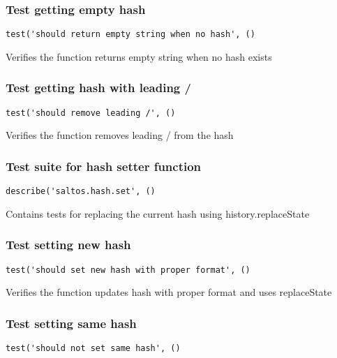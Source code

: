 \documentclass[a4paper]{article}
\begin{document}
\subsubsection{Test getting empty hash}

\begin{lstlisting}
test('should return empty string when no hash', ()
\end{lstlisting}

Verifies the function returns empty string when no hash exists

\hypertarget{toc638}{}
\subsubsection{Test getting hash with leading /}

\begin{lstlisting}
test('should remove leading /', ()
\end{lstlisting}

Verifies the function removes leading / from the hash

\hypertarget{toc639}{}
\subsubsection{Test suite for hash setter function}

\begin{lstlisting}
describe('saltos.hash.set', ()
\end{lstlisting}

Contains tests for replacing the current hash
using history.replaceState

\hypertarget{toc640}{}
\subsubsection{Test setting new hash}

\begin{lstlisting}
test('should set new hash with proper format', ()
\end{lstlisting}

Verifies the function updates hash with proper format
and uses replaceState

\hypertarget{toc641}{}
\subsubsection{Test setting same hash}

\begin{lstlisting}
test('should not set same hash', ()
\end{lstlisting}
\end{document}

